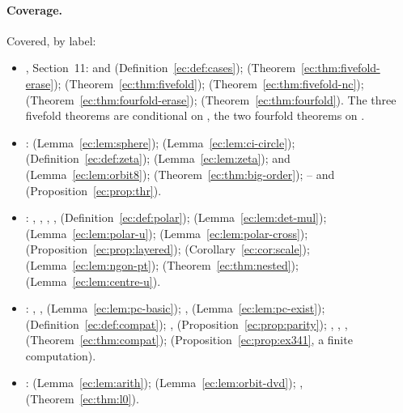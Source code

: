\paragraph{Coverage.} Covered, by label:
\begin{itemize}
\item {}, Section~11:  and 
  (Definition~\ref{ec:def:cases});  (Theorem~\ref{ec:thm:fivefold-erase});
   (Theorem~\ref{ec:thm:fivefold}); 
  (Theorem~\ref{ec:thm:fivefold-nc});  (Theorem~\ref{ec:thm:fourfold-erase});
   (Theorem~\ref{ec:thm:fourfold}). The three fivefold theorems are conditional on
  , the two fourfold theorems on .
\item {}:  (Lemma~\ref{ec:lem:sphere});
   (Lemma~\ref{ec:lem:ci-circle});  (Definition~\ref{ec:def:zeta});
   (Lemma~\ref{ec:lem:zeta});  and 
  (Lemma~\ref{ec:lem:orbit8});  (Theorem~\ref{ec:thm:big-order}); -- and
   (Proposition~\ref{ec:prop:thr}).
\item {}: , , , , 
  (Definition~\ref{ec:def:polar});  (Lemma~\ref{ec:lem:det-mul}); 
  (Lemma~\ref{ec:lem:polar-u});  (Lemma~\ref{ec:lem:polar-cross}); 
  (Proposition~\ref{ec:prop:layered});  (Corollary~\ref{ec:cor:scale});
   (Lemma~\ref{ec:lem:ngon-pt});  (Theorem~\ref{ec:thm:nested});
   (Lemma~\ref{ec:lem:centre-u}).
\item {}: , ,
   (Lemma~\ref{ec:lem:pc-basic}); , 
  (Lemma~\ref{ec:lem:pc-exist});  (Definition~\ref{ec:def:compat}); ,
   (Proposition~\ref{ec:prop:parity}); , , ,
   (Theorem~\ref{ec:thm:compat});  (Proposition~\ref{ec:prop:ex341}, a finite
  computation).
\item {}:  (Lemma~\ref{ec:lem:arith}); 
  (Lemma~\ref{ec:lem:orbit-dvd}); ,  (Theorem~\ref{ec:thm:l0}).
\end{itemize}
